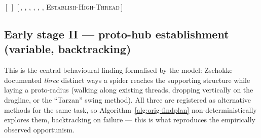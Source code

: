 \begin{algorithm}[H]
\caption{Method for \textsc{Explore-And-Bridge}}
\label{alg:orig-explore}
\begin{algorithmic}[1]
    \State \Return $[\,]$
  \EndIf
  \State \Return $\bigl[$\,, ,\newline
    \hspace*{85.8pt}, ,\newline
    \hspace*{85.8pt}, ,\newline
    \hspace*{85.8pt}\textsc{Establish-High-Thread}\,$\bigr]$
\EndFunction
\end{algorithmic}
\end{algorithm}

\subsection{Early stage II --- proto-hub establishment (variable, backtracking)}
\label{sec:orig-protohub}

This is the central behavioural finding formalised by the model: Zschokke documented \textit{three} distinct ways a spider reaches the supporting structure while laying a proto-radius (walking along existing threads, dropping vertically on the dragline, or the ``Tarzan'' swing method). All three are registered as alternative methods for the same task, so Algorithm~\ref{alg:orig-findplan} non-deterministically explores them, backtracking on failure --- this is what reproduces the empirically observed opportunism.

